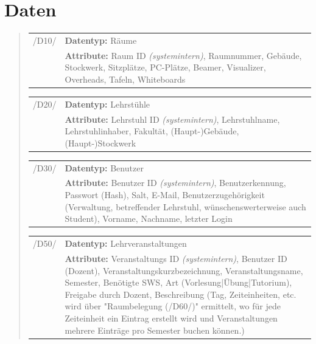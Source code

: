 \section{Daten}

\begin{quote}
\begin{tabular}{p{1cm}p{12cm}}


	 /D10/	& \textbf{Datentyp:} Räume \\
				& \textbf{Attribute:} Raum ID \textsl{(systemintern)}, Raumnummer, Gebäude, Stockwerk, Sitzplätze, PC-Plätze, Beamer, Visualizer, Overheads, Tafeln, Whiteboards  \\[0.25cm]

\end{tabular}
\begin{tabular}{p{1cm}p{12cm}}
		
	 /D20/	& \textbf{Datentyp:} Lehrstühle \\
				& \textbf{Attribute:} Lehrstuhl ID \textsl{(systemintern)}, Lehrstuhlname, Lehrstuhlinhaber, Fakultät, (Haupt-)Gebäude, (Haupt-)Stockwerk  \\[0.25cm]

\end{tabular}
\begin{tabular}{p{1cm}p{12cm}}
					
	 /D30/	& \textbf{Datentyp:} Benutzer \\
				& \textbf{Attribute:} Benutzer ID \textsl{(systemintern)}, Benutzerkennung, Passwort (Hash), Salt, E-Mail, Benutzerzugehörigkeit (Verwaltung, betreffender Lehrstuhl, wünschenswerterweise auch Student), Vorname, Nachname, letzter Login  \\[0.25cm]

\end{tabular}
\begin{tabular}{p{1cm}p{12cm}}
	
	 /D50/	& \textbf{Datentyp:} Lehrveranstaltungen \\
				& \textbf{Attribute:} Veranstaltungs ID \textsl{(systemintern)}, Benutzer ID (Dozent), Veranstaltungskurzbezeichnung, Veranstaltungsname, Semester, Benötigte SWS, Art (Vorlesung|Übung|Tutorium), Freigabe durch Dozent, Beschreibung (Tag, Zeiteinheiten, etc. wird über "Raumbelegung (/D60/)" ermittelt, wo für jede Zeiteinheit ein Eintrag erstellt wird und Veranstaltungen mehrere Einträge pro Semester buchen können.) \\[0.25cm]


\end{tabular}
\end{quote}
